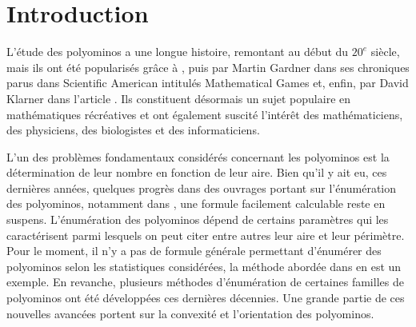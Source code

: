 \chapter*{Introduction}
L’étude des polyominos a une longue histoire, remontant au début du $20^{e}$ siècle, mais ils ont été popularisés grâce à \cite{SWC1,SWC2}, puis par Martin Gardner dans ses chroniques  parus dans Scientific American intitulés \og Mathematical Games\fg{} \cite{MarG} et, enfin, par David Klarner dans l'article \cite{K1-Ri1}. Ils constituent désormais un sujet populaire en mathématiques récréatives et ont également suscité l'intérêt des mathématiciens, des physiciens, des biologistes et des informaticiens.


L'un des problèmes fondamentaux considérés concernant les polyominos est la détermination de leur nombre en fonction de leur aire. Bien qu'il y ait eu, ces dernières années, quelques progrès dans des ouvrages portant sur l’énumération des polyominos, notamment dans \cite{De-Du}, une formule facilement calculable reste en suspens. L'énumération des polyominos dépend  de certains paramètres qui les caractérisent parmi lesquels on peut citer entre autres leur aire et leur périmètre. Pour le moment, il n'y a pas de formule générale permettant d'énumérer des polyominos selon les statistiques considérées, la méthode abordée dans \cite{K1-Ri1} en est un exemple. En revanche, plusieurs méthodes d'énumération de certaines familles de polyominos ont été développées ces dernières décennies. Une grande partie de ces nouvelles  avancées portent sur la convexité et l'orientation des polyominos.


